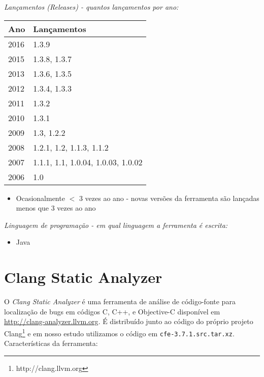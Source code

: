 \begin{description}

  \item {\it Lançamentos ({\it Releases}) - quantos lançamentos por ano:}
    \begin{table}[h!]
      \centering
      \begin{tabular}{| l | l |}
        \hline
        Ano  & Lançamentos                        \\
        \hline
        2016 & 1.3.9                              \\
        2015 & 1.3.8, 1.3.7                       \\
        2013 & 1.3.6, 1.3.5                       \\
        2012 & 1.3.4, 1.3.3                       \\
        2011 & 1.3.2                              \\
        2010 & 1.3.1                              \\
        2009 & 1.3, 1.2.2                         \\
        2008 & 1.2.1, 1.2, 1.1.3, 1.1.2           \\
        2007 & 1.1.1, 1.1, 1.0.04, 1.0.03, 1.0.02 \\
        2006 & 1.0                                \\
        \hline
      \end{tabular}
    \end{table}
    \begin{itemize}
      \item Ocasionalmente $<$ 3 vezes ao ano - novas versões da ferramenta são lançadas menos que 3 vezes ao ano
    \end{itemize}

  \item {\it Linguagem de programação - em qual linguagem a ferramenta é escrita:}
    \begin{itemize}
      \item Java
    \end{itemize}

\end{description}

\section{Clang Static Analyzer}

O {\it Clang Static Analyzer} é uma ferramenta de análise de código-fonte para
localização de bugs em códigos C, C++, e Objective-C disponível em
\url{http://clang-analyzer.llvm.org}. É distribuído junto ao código do próprio
projeto Clang\footnote{http://clang.llvm.org} e em nosso estudo utilizamos o
código em \texttt{cfe-3.7.1.src.tar.xz}. Características da ferramenta:

